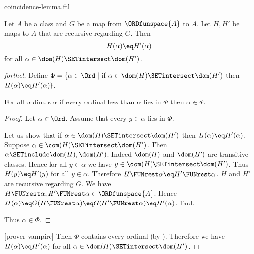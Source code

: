 \documentclass{naproche-library}
\begin{document}
\begin{smodule}[title=The Coincidence Lemma]{coincidence-lemma.ftl}
  
\begin{lemma}[forthel,title=Coincidence Lemma,id=transfinite-recursion_coincidence]
  Let $A$ be a class and $G$ be a map from $\ORDfunspace{A}$ to $A$.
  Let $H, H'$ be maps to $A$ that are recursive regarding $G$.
  Then \[ H(\alpha) \eq H'(\alpha) \] for all $\alpha \in \dom(H) \SETintersect \dom(H')$.
\end{lemma}
\begin{proof}[forthel]
  Define $\Phi = \{ \alpha \in \Ord \mid$ if
  $\alpha \in \dom(H) \SETintersect \dom(H')$ then $H(\alpha) \eq H'(\alpha) \}$.

  For all ordinals $\alpha$ if every ordinal less than $\alpha$ lies in $\Phi$ then $\alpha \in \Phi$.
  \begin{proof}
    Let $\alpha \in \Ord$.
    Assume that every $y \in \alpha$ lies in $\Phi$.

    Let us show that if $\alpha \in \dom(H) \SETintersect \dom(H')$ then
    $H(\alpha) \eq H'(\alpha)$.
      Suppose $\alpha \in \dom(H) \SETintersect \dom(H')$.
      Then $\alpha \SETinclude \dom(H), \dom(H')$.
      Indeed $\dom(H)$ and $\dom(H')$ are transitive classes.
      Hence for all $y \in \alpha$ we have $y \in \dom(H) \SETintersect \dom(H')$.
      Thus $H(y) \eq H'(y)$ for all $y \in \alpha$.
      Therefore $H \FUNrest \alpha \eq H' \FUNrest \alpha$.
      $H$ and $H'$ are recursive regarding $G$.
      We have $H \FUNrest \alpha, H' \FUNrest \alpha \in \ORDfunspace{A}$.
      Hence $H(\alpha)
        \eq G(H \FUNrest \alpha)
        \eq G(H' \FUNrest \alpha)
        \eq H'(\alpha)$.
    End.

    Thus $\alpha \in \Phi$.
  \end{proof}

  [prover vampire]
  Then $\Phi$ contains every ordinal (by ).
  Therefore we have $H(\alpha) \eq H'(\alpha)$ for all $\alpha \in \dom(H) \SETintersect \dom(H')$.
\end{proof}
\end{smodule}
\end{document}
